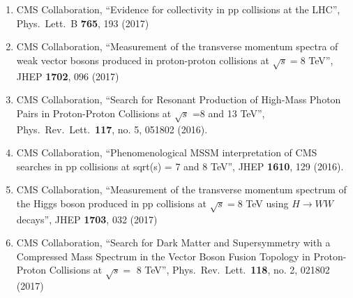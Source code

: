\begin{enumerate}
\item CMS Collaboration, ``Evidence for collectivity in pp collisions at the LHC'', Phys.\ Lett.\ B {\bf 765}, 193 (2017)

\item CMS Collaboration, ``Measurement of the transverse momentum spectra of weak vector bosons produced in proton-proton collisions at $ \sqrt{s}=8 $ TeV'', JHEP {\bf 1702}, 096 (2017)

\item CMS Collaboration, ``Search for Resonant Production of High-Mass Photon Pairs in Proton-Proton Collisions at $\sqrt s$ =8 and 13 TeV'', Phys.\ Rev.\ Lett.\  {\bf 117}, no. 5, 051802 (2016).

\item CMS Collaboration, ``Phenomenological MSSM interpretation of CMS searches in pp collisions at sqrt(s) = 7 and 8 TeV'', JHEP {\bf 1610}, 129 (2016).

\item CMS Collaboration, ``Measurement of the transverse momentum spectrum of the Higgs boson produced in pp collisions at $ \sqrt{s}=8 $ TeV using $H \to WW$ decays'', JHEP {\bf 1703}, 032 (2017)

\item CMS Collaboration, ``Search for Dark Matter and Supersymmetry with a Compressed Mass Spectrum in the Vector Boson Fusion Topology in Proton-Proton Collisions at $\sqrt{s} =$ 8 TeV'', Phys.\ Rev.\ Lett.\  {\bf 118}, no. 2, 021802 (2017)


\end{enumerate}
